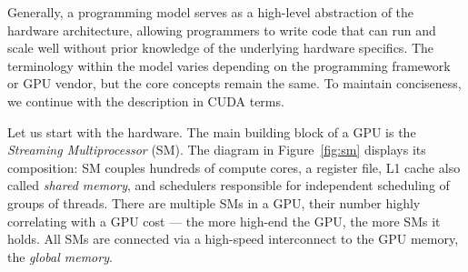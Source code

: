 Generally, a programming model serves as a high-level abstraction of the hardware architecture, allowing programmers to write code that can run and scale well without prior knowledge of the underlying hardware specifics. The terminology within the model varies depending on the programming framework or GPU vendor, but the core concepts remain the same. To maintain conciseness, we continue with the description in CUDA terms.

Let us start with the hardware. The main building block of a GPU is the \emph{Streaming Multiprocessor} (SM). The diagram in Figure~\ref{fig:sm} displays its composition: SM couples hundreds of compute cores, a register file, L1 cache also called \emph{shared memory}, and schedulers responsible for independent scheduling of groups of threads. There are multiple SMs in a GPU, their number highly correlating with a GPU cost --- the more high-end the GPU, the more SMs it holds. All SMs are connected via a high-speed interconnect to the GPU memory, the \emph{global memory}.

